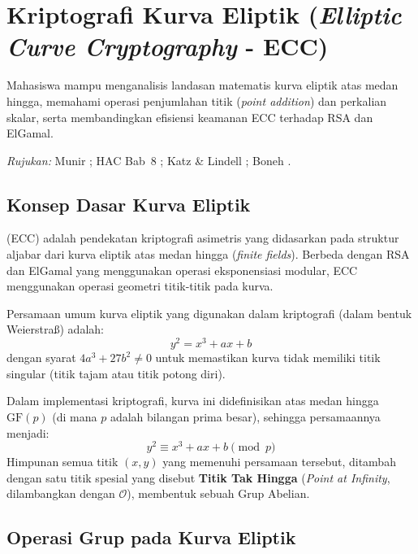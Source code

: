\section{Kriptografi Kurva Eliptik (\textit{Elliptic Curve Cryptography} - ECC)}

\begin{subcpmk}
  \item Mahasiswa mampu menganalisis landasan matematis kurva eliptik atas medan hingga, memahami operasi penjumlahan titik (\textit{point addition}) dan perkalian skalar, serta membandingkan efisiensi keamanan ECC terhadap RSA dan ElGamal.
\end{subcpmk}

\noindent\textit{Rujukan:} Munir \cite{munir2019,munir_slides_itb}; HAC Bab~8 \cite{hac_online}; Katz \& Lindell \cite{katz2020}; Boneh \cite{boneh_cs255}.

\subsection{Konsep Dasar Kurva Eliptik}

 (ECC) adalah pendekatan kriptografi asimetris yang didasarkan pada struktur aljabar dari kurva eliptik atas medan hingga (\textit{finite fields}). Berbeda dengan RSA dan ElGamal yang menggunakan operasi eksponensiasi modular, ECC menggunakan operasi geometri titik-titik pada kurva.

Persamaan umum kurva eliptik yang digunakan dalam kriptografi (dalam bentuk Weierstraß) adalah:
\begin{equation}
  y^2 = x^3 + ax + b
\end{equation}
dengan syarat $4a^3 + 27b^2 \neq 0$ untuk memastikan kurva tidak memiliki titik singular (titik tajam atau titik potong diri).

Dalam implementasi kriptografi, kurva ini didefinisikan atas medan hingga $\mathrm{GF}(p)$ (di mana $p$ adalah bilangan prima besar), sehingga persamaannya menjadi:
\begin{equation}
  y^2 \equiv x^3 + ax + b \pmod{p}
\end{equation}
Himpunan semua titik $(x, y)$ yang memenuhi persamaan tersebut, ditambah dengan satu titik spesial yang disebut \textbf{Titik Tak Hingga} (\textit{Point at Infinity}, dilambangkan dengan $\mathcal{O}$), membentuk sebuah Grup Abelian.

\subsection{Operasi Grup pada Kurva Eliptik}

